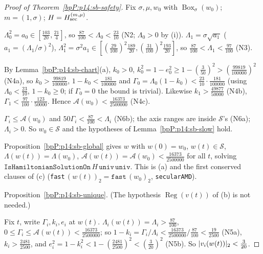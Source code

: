 \begin{proof}[Proof of Theorem~\ref{bpP:p14:sb-safety}]
Fix $\sigma,\mu,w_0$ with $\operatorname{Box}_\sigma(w_0)$; $m=(1,\sigma)$; $H=H_{\rm sec}^{(m,\mu)}$.

\label{stepP:p14:sb-th-1} $\Lambda_0^2=a_0\in[\frac{103}{20},\frac{21}4]$, so $\frac{87}{100}<\Lambda_0<\frac{23}{10}$ (N2; $\Lambda_0>0$ by (i)). $\Lambda_1=\sigma\sqrt{a_1}$ ($a_1=(\Lambda_1/\sigma)^2$), $\Lambda_1^2=\sigma^2a_1\in[(\frac{29}{100})^2\frac{189}{20},(\frac{31}{100})^2\frac{193}{20}]$, so $\frac{87}{100}<\Lambda_1<\frac{97}{100}$ (N3).

\label{stepP:p14:sb-th-2} By Lemma~\ref{bpP:p14:sb-chart}(a), $k_0>0$, $k_0^2=1-e_0^2\ge1-(\frac3{50})^2>(\frac{99819}{100000})^2$ (N4a), so $k_0>\frac{99819}{100000}$, $1-k_0<\frac{181}{100000}$ and $\Gamma_0=\Lambda_0(1-k_0)<\frac{23}{10}\cdot\frac{181}{100000}$ (using $\Lambda_0<\frac{23}{10}$, $1-k_0\ge0$; if $\Gamma_0=0$ the bound is trivial). Likewise $k_1>\frac{49877}{50000}$ (N4b), $\Gamma_1<\frac{97}{100}\cdot\frac{123}{50000}$.
Hence $\mathcal A(w_0)<\frac{16373}{2500000}$ (N4c).

\label{stepP:p14:sb-th-3} $\Gamma_i\le\mathcal A(w_0)$ and $50\Gamma_i<\frac{87}{100}<\Lambda_i$ (N6b); the axis ranges are inside $\mathcal S$'s (N6a); $\Lambda_i>0$. So $w_0\in\mathcal S$ and the hypotheses of Lemma~\ref{bpP:p14:sb-slow} hold.

\label{stepP:p14:sb-th-4} Proposition~\ref{bpP:p14:sb-global} gives $w$ with $w(0)=w_0$, $w(t)\in\mathcal S$, $\Lambda(w(t))=\Lambda(w_0)$, $\mathcal A(w(t))=\mathcal A(w_0)<\frac{16373}{2500000}$ for all $t$, solving $\texttt{IsHamiltonianSolutionOn}\,H\,\texttt{univ}\,\texttt{univ}$. This is (a) and the first conserved clauses of (c) (\texttt{fast}\,$(w(t))_2=\texttt{fast}\,(w_0)_2$, \texttt{secularAMD}).

\label{stepP:p14:sb-th-5} Proposition~\ref{bpP:p14:sb-unique}. (The hypothesis $\operatorname{Reg}(v(t))$ of (b) is not needed.)

\label{stepP:p14:sb-th-6} Fix $t$, write $\Gamma_i,k_i,e_i$ at $w(t)$. $\Lambda_i(w(t))=\Lambda_i>\frac{87}{100}$, $0\le\Gamma_i\le\mathcal A(w(t))<\frac{16373}{2500000}$; so $1-k_i=\Gamma_i/\Lambda_i<\frac{16373}{2500000}\big/\frac{87}{100}<\frac{19}{2500}$ (N5a), $k_i>\frac{2481}{2500}$, and $e_i^2=1-k_i^2<1-(\frac{2481}{2500})^2<(\frac3{20})^2$ (N5b). So $\lvert v_i(w(t))\rvert_2<\frac3{20}$.


\end{proof}
